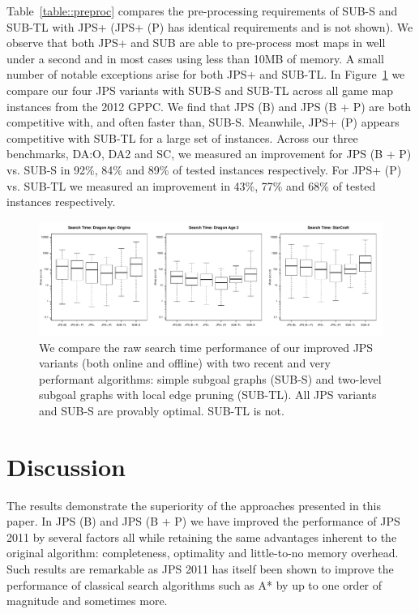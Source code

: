Table~\ref{table::preproc} compares the pre-processing requirements of 
SUB-S and SUB-TL with JPS+ (JPS+ (P) has identical requirements and is not shown). 
We observe that both JPS+ and SUB are able to pre-process most maps in well under a second 
and in most cases using less than 10MB of memory. A small number of notable exceptions 
arise for both JPS+ and SUB-TL.
In Figure~\ref{fig::vs_sub} we compare our four JPS variants with SUB-S and SUB-TL across all
game map instances from the 2012 GPPC. We find that JPS (B) and JPS (B + P) are both
competitive with, and often faster than, SUB-S. Meanwhile, JPS+ (P) appears competitive 
with SUB-TL for a large set of instances.
Across our three benchmarks, DA:O, DA2 and SC, we measured an improvement for 
JPS (B + P) vs. SUB-S in 92\%, 84\% and 89\% of tested instances respectively.
For JPS+ (P) vs. SUB-TL we measured an improvement in 43\%, 77\% and 68\% of 
tested instances respectively.

\begin{figure}[tb] 
\begin{center}
		   \includegraphics[width=2.15\columnwidth, trim = 0mm 0mm 0mm 0mm]
			{diagrams/jps_vs_sub_boxplot.pdf}
       \end{center}
		\vspace{-1em}
	   \caption{\small We compare the raw search time performance of our improved JPS variants (both online
		   and offline) with two recent and very performant algorithms: simple subgoal graphs (SUB-S) 
		   and two-level subgoal graphs with local edge pruning (SUB-TL). All JPS variants and SUB-S 
		   are provably optimal. SUB-TL is not.}
\label{fig::vs_sub}
\end{figure}

\section{Discussion}
The results demonstrate the superiority of the approaches presented in this
paper. In JPS (B) and JPS (B + P) we have improved the performance of
JPS 2011 by several factors all while retaining
the same advantages inherent to the original algorithm: completeness, 
optimality and little-to-no memory overhead. Such results are remarkable as
JPS 2011 has itself been shown to improve the performance of classical
search algorithms such as A* by up to one order of magnitude and sometimes more.

